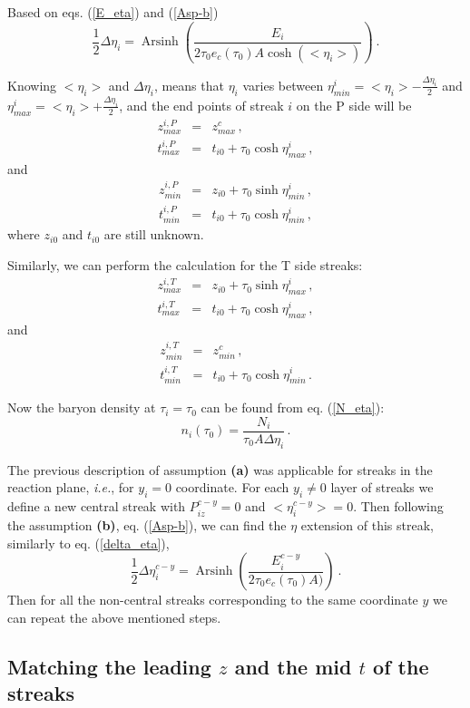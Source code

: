 \documentclass[aps,prc,twocolumn,floatfix,showpacs,a4paper,
nofootinbib,amsmath,amssymb]{revtex4-1}
\newcommand{\be}{\begin{equation}}
\newcommand{\ee}{\end{equation}}
\newcommand{\ba}{\begin{eqnarray}}
\newcommand{\ea}{\end{eqnarray}}
\DeclareMathOperator{\Arsinh}{Arsinh}
\begin{document}
Based on eqs. (\ref{E_eta}) and (\ref{Asp-b})
\be
\frac{1}{2}\Delta \eta_i = 
\Arsinh \left( \frac{E_i}{2 \tau_0 e_c(\tau_0) A \cosh(<\eta_i>)}
\right) \ .
\label{delta_eta}
\ee

Knowing $<\eta_i>$ and $\Delta \eta_i$, means that 
$\eta_i$ varies between $\eta_{min}^i= <\eta_i> - \frac{\Delta\eta_i}{2}$  and 
$\eta_{max}^i = <\eta_i> + \frac{\Delta\eta_i}{2}$,
and the end points of streak $i$ on the P side will  be
\ba
z_{max}^{i,P} & = & z_{max}^c \,, \nonumber \\
t_{max}^{i,P} & = & t_{i0} + \tau_0 \cosh \eta_{max}^{i}  \,,
\label{zt_max_P}
\ea
and
\ba
z_{min}^{i,P} & = & z_{i0} + \tau_0 \sinh \eta_{min}^{i}\,, \nonumber \\
t_{min}^{i,P} & = & t_{i0} + \tau_0 \cosh \eta_{min}^{i}  \,,
\label{zt_min_P}
\ea
where $z_{i0}$ and $t_{i0}$ are still unknown.

Similarly, we can perform the calculation for the T side streaks: 
\ba
z_{max}^{i,T} & = & z_{i0} + \tau_0 \sinh \eta_{max}^{i}\,, \nonumber \\
t_{max}^{i,T} & = & t_{i0} + \tau_0 \cosh \eta_{max}^{i}  \,,
\label{zt_max_T}
\ea
and
\ba
z_{min}^{i,T} & = & z_{min}^{c}\,, \nonumber \\
t_{min}^{i,T} & = & t_{i0} + \tau_0 \cosh \eta_{min}^{i}  \,.
\label{zt_min_T}
\ea


Now the baryon density at $\tau_i=\tau_0$ can be found from 
eq. (\ref{N_eta}):
\be
n_i(\tau_0)=\frac{N_i}{\tau_0 A \Delta \eta_i} \,.
\label{n_tau0}
\ee 

The previous description of assumption {\bf (a)} was applicable for streaks 
in the reaction plane, {\it i.e.}, for $y_i=0$ coordinate. For each $y_i \ne 0$ layer
of streaks we define a new central streak with $P_{iz}^{c-y}=0$ and $<\eta_{i}^{c-y}>=0$. Then following the assumption {\bf (b)}, eq. (\ref{Asp-b}), 
we can find the $\eta$ extension of this streak, similarly to eq. (\ref{delta_eta}),
\be
\frac{1}{2}\Delta \eta_i^{c-y} = 
\Arsinh \left( \frac{E_i^{c-y}}{2 \tau_0 e_c(\tau_0) A )}
\right) \ .
\label{delta_eta_y}
\ee  
Then for all the non-central streaks corresponding to the same coordinate $y$ we can repeat the above mentioned steps. 




\subsection{Matching the leading {\large $z$} 
and the mid {\large $t$} of the streaks}
\label{3B}
\end{document}
